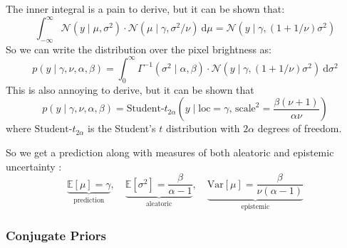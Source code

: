 \documentclass{article}
\newcommand{\f}{\frac}
\newcommand{\0}{\varnothing}
\theoremstyle{definition}
\renewcommand{\d}{\mathrm{d}}
\begin{document}
The inner integral is a pain to derive, but it can be shown that:
$$\int_{-\infty}^\infty \mathcal{N}(y \mid \mu, \sigma^2) \cdot \mathcal{N}(\mu \mid \gamma, \sigma^2/\nu)\ \d\mu = \mathcal{N}(y \mid \gamma, (1 + 1/\nu)\sigma^2)$$
So we can write the distribution over the pixel brightness as:
$$p(y \mid \gamma, \nu, \alpha, \beta) = \int_0^\infty \Gamma^{-1}(\sigma^2 \mid \alpha, \beta) \cdot \mathcal{N}(y \mid \gamma, (1 + 1/\nu)\sigma^2)\ \d\sigma^2$$
This is also annoying to derive, but it can be shown that
$$p(y \mid \gamma, \nu, \alpha, \beta) = \text{Student-}t_{2\alpha} \left( y \mid \mathrm{loc} = \gamma,\,\mathrm{scale}^2 = \f{\beta(\nu + 1)}{\alpha \nu} \right)$$
where $\text{Student-}t_{2\alpha}$ is the Student's $t$ distribution with $2\alpha$ degrees of freedom.

So we get a prediction along with measures of both aleatoric and epistemic uncertainty \cite{amini2020deep}:
$$\underbrace{\mathbb{E}[\mu] = \gamma}_{\text{prediction}}, \quad \underbrace{\mathbb{E}[\sigma^2] = \f{\beta}{\alpha - 1}}_{\text{aleatoric}}, \quad \underbrace{\mathrm{Var}[\mu] = \f{\beta}{\nu(\alpha - 1)}}_{\text{epistemic}}$$

\subsubsection{Conjugate Priors}
\end{document}
